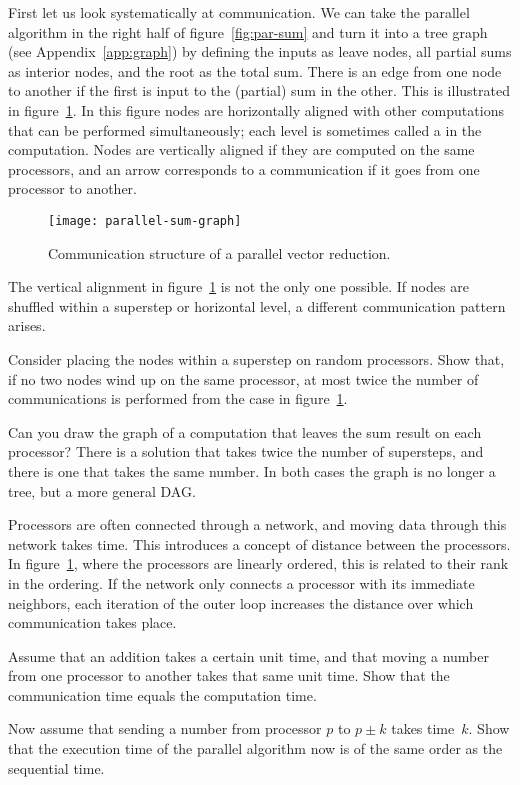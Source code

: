 First let us look systematically at communication. We can take the
parallel algorithm in the right half
of figure~\ref{fig:par-sum} and turn it into a tree graph
(see Appendix~\ref{app:graph}) by defining the inputs as leave nodes,
all partial sums as interior nodes, and the root as the total
sum. There is an edge from one node to another if the first is input
to the (partial) sum in the other. This is illustrated in
figure~\ref{fig:par-sum-graph}. In this figure nodes are horizontally
aligned with other computations that can be performed simultaneously;
each level is sometimes called a  in the computation.
Nodes are vertically aligned if they are computed on the same
processors, and an arrow corresponds to a communication if it goes
from one processor to another. 
\begin{figure}[ht]
  \texttt{[image: parallel-sum-graph]}
  \caption{Communication structure of a parallel vector reduction.}
  \label{fig:par-sum-graph}
\end{figure}
The vertical alignment in figure~\ref{fig:par-sum-graph} is not the
only one possible. If nodes are shuffled within a superstep or
horizontal level, a different communication pattern arises.
\begin{exercise}
  Consider placing the nodes within a superstep on random
  processors. Show that, if no two nodes wind up on the same
  processor, at most twice the number of communications is performed
  from the case in figure~\ref{fig:par-sum-graph}.
\end{exercise}

\begin{exercise}
  Can you draw the graph of a computation that leaves the sum result
  on each processor? There is a solution that takes twice the number
  of supersteps, and there is one that takes the same number. In both
  cases the graph is no longer a tree, but a more general \ac{DAG}.
\end{exercise}

Processors are often connected through a network, and moving data
through this network takes time. This introduces a concept of distance
between the processors.
In figure~\ref{fig:par-sum-graph}, where the processors are linearly ordered,
this is related to their rank in the ordering.
If the network only connects a
processor with its immediate neighbors,  each iteration of the
outer loop increases the distance over which communication takes
place.

\begin{exercise}
  \label{ex:summing0}
  Assume that an addition takes a certain unit time, and that moving a
  number from one processor to another takes that same unit time. Show
  that the communication time equals the computation time.

  Now assume that sending a number from processor $p$ to $p\pm k$
  takes time~$k$. Show that the execution time of the parallel
  algorithm now is of the same order as the sequential time.
\end{exercise}

